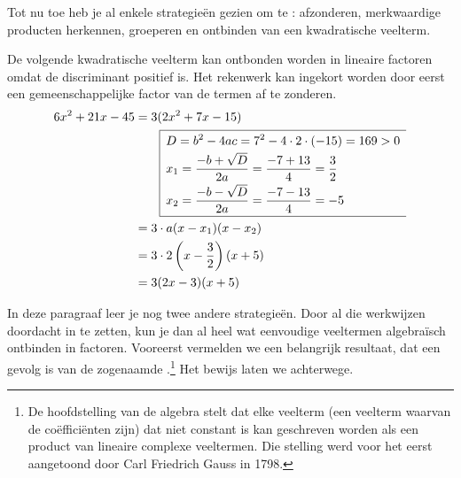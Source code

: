 \documentclass{ximera}
\begin{document}
	\author{Koen De Naeghel}
	\label{xim:veeltermen_ontbinden_in_factoren}

Tot nu toe heb je al enkele strategie\"en gezien om te : afzonderen, merkwaardige producten herkennen, groeperen en ontbinden van een kwadratische veelterm.

\begin{example}
De volgende kwadratische veelterm kan ontbonden worden in lineaire factoren omdat de discriminant positief is. Het rekenwerk kan ingekort worden door eerst een gemeenschappelijke factor van de termen af te zonderen. 
\begin{align*}
6x^2+21x-45 & = 3(2x^2 + 7x - 15) \\
& \qquad 
\begin{array}{|l}
\hline
\begin{aligned}
\vrule height 0.4cm width 0cm
& D = b^2 - 4ac = 7^2-4\cdot 2 \cdot (-15) = 169 > 0 \\[0.1cm] 
& x_{1} = \frac{-b + \sqrt{D}}{2a} = \frac{-7 + 13}{4} = \frac{3}{2} \\[0.1cm] 
& x_{2} = \frac{-b - \sqrt{D}}{2a} = \frac{-7 - 13}{4} = -5 \\[0.1cm]
\end{aligned} \\
\hline
\end{array} \\
& = 3 \cdot a(x-x_1)(x-x_2) \\
& = 3 \cdot 2\left(x- \frac{3}{2}\right)(x+5) \\
& = 3(2x-3)(x+5)
\end{align*}
\end{example}

In deze paragraaf leer je nog twee andere strategie\"en. Door al die werkwijzen doordacht in te zetten, kun je dan al heel wat eenvoudige veeltermen algebra\"isch ontbinden in factoren. Vooreerst vermelden we een belangrijk resultaat, dat een gevolg is van de zogenaamde .\footnote{De hoofdstelling van de algebra stelt dat elke  veelterm (een veelterm waarvan de co\"effici\"enten  zijn) dat niet constant is kan geschreven worden als een product van lineaire complexe veeltermen. Die stelling werd voor het eerst aangetoond door Carl Friedrich Gauss in 1798.} Het bewijs laten we achterwege.
\end{document}
